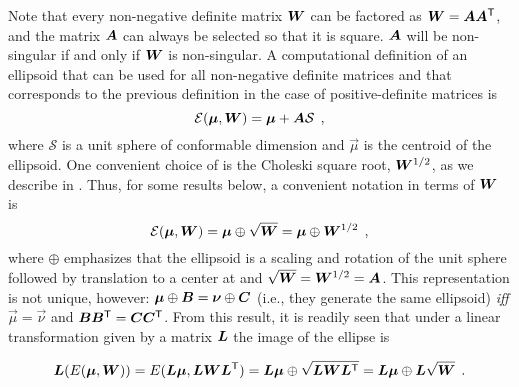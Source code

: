 Note that every non-negative definite matrix $\bm{W}$ can be factored as $\bm{W}=\bm{A}\bm{A}^\mathsf{T}$,
and the matrix $\bm{A}$ can always be selected so that it is square.
$\bm{A}$ will be non-singular if and only if $\bm{W}$ is non-singular.
A computational
definition of an ellipsoid that can be used for all non-negative definite matrices and that corresponds to the previous definition in the case of positive-definite matrices is
\begin{equation}
\mathcal{E}(\bm{\mu},\bm{W}) = \bm{\mu} + \bm{A} \mathcal{S} \:\: ,
\end{equation}
where $\mathcal{S}$ is a unit sphere of conformable dimension and $\vec{\mu}$ is the centroid of the ellipsoid.
One convenient choice of  is the Choleski square root, $\bm{W}^{1/2}$, as we describe in .
Thus, for some results below, a convenient notation in terms of $\bm{W}$ is
\begin{equation}\label{eq:ellipsoidW}
\mathcal{E}(\bm{\mu}, \bm{W}) = \bm{\mu} \oplus \sqrt{\bm{W}} = \bm{\mu} \oplus \bm{W}^{1/2} \:\: ,
\end{equation}
where $\oplus$
emphasizes that the ellipsoid is a scaling and rotation of the unit sphere followed by translation to
a center at \vec{\mu} and $\sqrt{\bm{W}}=\bm{W}^{1/2}=\bm{A}$. This representation is not unique,
however:  $\bm{\mu} \oplus \bm{B} = \bm{\nu} \oplus \bm{C}$ (i.e., they generate the same ellipsoid)
\emph{iff} $\vec{\mu} = \vec{\nu}$ and $\bm{B}\bm{B}^\mathsf{T} = \bm{C}\bm{C}^\mathsf{T}$.
From this result, it is readily seen that under a linear transformation given by a matrix
$\bm{L}$
the image of the ellipse is

\begin{equation*}
\bm{L}(E(\bm{\mu} ,\bm{W}))=E(\bm{L}\bm{\mu} ,\bm{L}\bm{W}{\bm{L}}^\mathsf{T})=\bm{L}\bm{\mu} \oplus \sqrt{\bm{L}\bm{W}{\bm{L}}^\mathsf{T}}=\bm{L}\bm{\mu} \oplus \bm{L}\sqrt{\bm{W}} \:\: .
\end{equation*}

